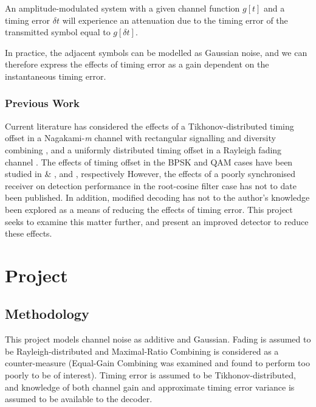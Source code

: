 \begin{propo}
An amplitude-modulated system with a given channel function $g[t]$ and a timing error $\delta t$ will experience an attenuation due to the timing error of the transmitted symbol equal to $g[\delta t]$.
\end{propo}

In practice, the adjacent symbols can be modelled as Gaussian noise, and we can therefore express the effects of timing error as a gain dependent on the instantaneous timing error. 

\section{Previous Work}

Current literature has considered the effects of a Tikhonov-distributed timing offset in a Nagakami-\emph{m} channel with rectangular signalling and diversity combining \cite{[2]}, and a uniformly distributed timing offset in a Rayleigh fading channel \cite{[6]}. The effects of timing offset in the BPSK and QAM cases have been studied in \cite{[3]} \& \cite{[4]}, and \cite{[5]}, respectively However, the effects of a poorly synchronised receiver on detection performance in the root-cosine filter case has not to date been published. In addition, modified decoding has not to the author's knowledge been explored as a means of reducing the effects of timing error. This project seeks to examine this matter further, and present an improved detector to reduce these effects.


\part{Project}

\chapter{Methodology}

This project models channel noise as additive and Gaussian. Fading is assumed to be Rayleigh-distributed and Maximal-Ratio Combining is considered as a counter-measure (Equal-Gain Combining was examined and found to perform too poorly to be of interest). Timing error is assumed to be Tikhonov-distributed, and knowledge of both channel gain and approximate timing error variance is assumed to be available to the decoder.


